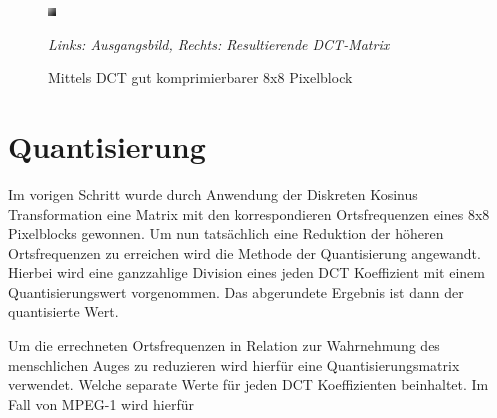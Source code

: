 \begin{figure}[h!]
    \centering
    \begin{multicols}{2}
    \includegraphics[scale=15]{images/2-2_dct_good.png}
    
    \end{multicols}
    \caption{Mittels DCT gut komprimierbarer 8x8 Pixelblock}
    \textit{Links: Ausgangsbild, Rechts: Resultierende DCT-Matrix}
    \label{fig:dct-good}
\end{figure}


\section{Quantisierung}

Im vorigen Schritt wurde durch Anwendung der Diskreten Kosinus Transformation eine Matrix mit den korrespondieren Ortsfrequenzen eines 8x8 Pixelblocks gewonnen. Um nun tatsächlich eine Reduktion der höheren Ortsfrequenzen zu erreichen wird die Methode der Quantisierung angewandt. Hierbei wird eine ganzzahlige Division eines jeden DCT Koeffizient mit einem Quantisierungswert vorgenommen. Das abgerundete Ergebnis ist dann der quantisierte Wert.


Um die errechneten Ortsfrequenzen in Relation zur Wahrnehmung des menschlichen Auges zu reduzieren wird hierfür eine Quantisierungsmatrix verwendet. Welche separate Werte für jeden DCT Koeffizienten beinhaltet. Im Fall von MPEG-1 wird hierfür 
\cite{ISO13586}

